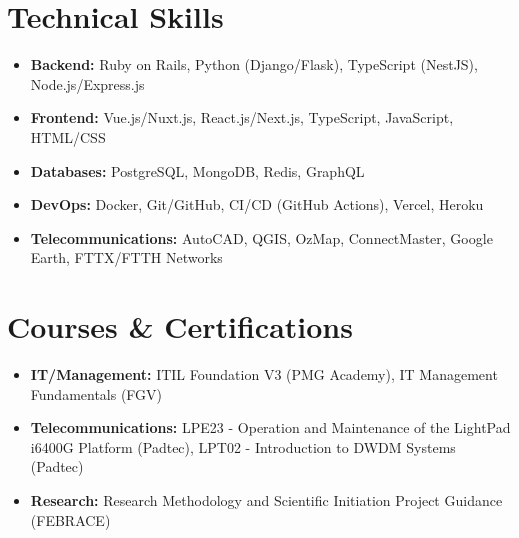 \documentclass[letterpaper,11pt]{article}
\newcommand{\resumeItem}[1]{
  \item\small{
    {#1 \vspace{-2pt}}
  }
}
\newcommand{\resumeSubHeadingListStart}{\begin{itemize}[leftmargin=0.0in, label={}]}
\newcommand{\resumeSubHeadingListEnd}{\end{itemize}}
\begin{document}
\section{Technical Skills}
\begin{minipage}{\dimexpr\textwidth-0.2cm}
  \hspace*{0.2cm}
  \begin{minipage}{\dimexpr\textwidth}
    \resumeSubHeadingListStart
      \setlength{\itemsep}{2pt}
      \resumeItem{\textbf{Backend:} Ruby on Rails, Python (Django/Flask), TypeScript (NestJS), Node.js/Express.js}
      \resumeItem{\textbf{Frontend:} Vue.js/Nuxt.js, React.js/Next.js, TypeScript, JavaScript, HTML/CSS}
      \resumeItem{\textbf{Databases:} PostgreSQL, MongoDB, Redis, GraphQL}
      \resumeItem{\textbf{DevOps:} Docker, Git/GitHub, CI/CD (GitHub Actions), Vercel, Heroku}
      \resumeItem{\textbf{Telecommunications:} AutoCAD, QGIS, OzMap, ConnectMaster, Google Earth, FTTX/FTTH Networks}
    \resumeSubHeadingListEnd
  \end{minipage}
\end{minipage}
\vspace{10pt}


\section{Courses \& Certifications}
\begin{minipage}{\dimexpr\textwidth-0.2cm}
  \hspace*{0.2cm}
  \begin{minipage}{\dimexpr\textwidth}
    \resumeSubHeadingListStart
      \setlength{\itemsep}{2pt}
      \resumeItem{
        \textbf{IT/Management:} ITIL Foundation V3 (PMG Academy), IT Management Fundamentals (FGV)
      }
      \resumeItem{
        \textbf{Telecommunications:} LPE23 - Operation and Maintenance of the LightPad i6400G Platform (Padtec), LPT02 - Introduction to DWDM Systems (Padtec)
      }
      \resumeItem{
        \textbf{Research:} Research Methodology and Scientific Initiation Project Guidance (FEBRACE)
      }
    \resumeSubHeadingListEnd
  \end{minipage}
\end{minipage}
\vspace{10pt}
\end{document}
